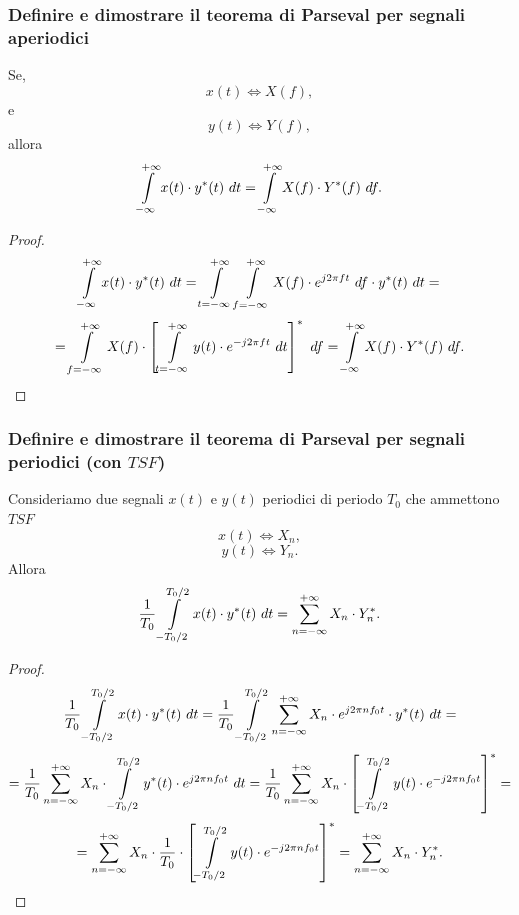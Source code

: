 \documentclass[12pt,oneside,openany]{memoir}
\numberwithin{equation}{subsection}
\newcommand{\dt}{\ dt}
\newcommand{\df}{\ df}
\begin{document}

\subsubsection{Definire e dimostrare il teorema di Parseval per segnali
aperiodici}
Se,
\[
    x(t) \iff X(f),
\]
e
\[
    y(t) \iff Y(f),
\]
allora
\[
    \int\displaylimits_{-\infty}^{+\infty} x(t) \cdot y^*(t) \dt =
    \int\displaylimits_{-\infty}^{+\infty} X(f) \cdot Y^*(f) \df.
\]
\begin{proof}
\[
    \int\displaylimits_{-\infty}^{+\infty} x(t) \cdot y^*(t) \dt =
    \int\displaylimits_{t = -\infty}^{+\infty}
    \int\displaylimits_{f = -\infty}^{+\infty} X(f) \cdot e^{j 2 \pi f t}
    \df \cdot y^*(t) \dt =
\]
\[
    = \int\displaylimits_{f = -\infty}^{+\infty} X(f) \cdot \left[
        \int\displaylimits_{t = -\infty}^{+\infty} y(t) \cdot e^{-j 2 \pi f t}
        \dt
    \right]^* \df = \int\displaylimits_{-\infty}^{+\infty} X(f) \cdot Y^*(f) \df
    .
\]
\end{proof}


\subsubsection{Definire e dimostrare il teorema di Parseval per segnali
periodici (con $TSF$)}
Consideriamo due segnali $x(t)$ e $y(t)$ periodici di periodo $T_0$ che
ammettono $TSF$
\[
    x(t) \iff X_n,
\]
\[
    y(t) \iff Y_n.
\]
Allora
\[
    \frac{1}{T_0} \int\displaylimits_{-T_0/2}^{T_0/2} x(t) \cdot y^*(t) \dt =
    \sum\displaylimits_{n = -\infty}^{+\infty} X_n \cdot Y^*_n.
\]
\begin{proof}
\[
    \frac{1}{T_0} \int\displaylimits_{-T_0/2}^{T_0/2} x(t) \cdot y^*(t) \dt =
    \frac{1}{T_0} \int\displaylimits_{-T_0/2}^{T_0/2}
    \sum\displaylimits_{n = -\infty}^{+\infty} X_n \cdot e^{j 2 \pi n f_0 t}
    \cdot y^*(t) \dt =
\]
\[
    = \frac{1}{T_0} \sum\displaylimits_{n = -\infty}^{+\infty} X_n \cdot
    \int\displaylimits_{-T_0/2}^{T_0/2} y^*(t) \cdot e^{j 2 \pi n f_0 t} \dt =
    \frac{1}{T_0} \sum\displaylimits_{n = -\infty}^{+\infty} X_n \cdot
    \left[
        \int\displaylimits_{-T_0/2}^{T_0/2} y(t) \cdot e^{-j 2 \pi n f_0 t}
    \right]^* =
\]
\[
    = \sum\displaylimits_{n = -\infty}^{+\infty} X_n \cdot
    \frac{1}{T_0} \cdot \left[
        \int\displaylimits_{-T_0/2}^{T_0/2} y(t) \cdot e^{-j 2 \pi n f_0 t}
    \right]^* =
    \sum\displaylimits_{n = -\infty}^{+\infty} X_n \cdot Y^*_n.
\]
\end{proof}
\end{document}

